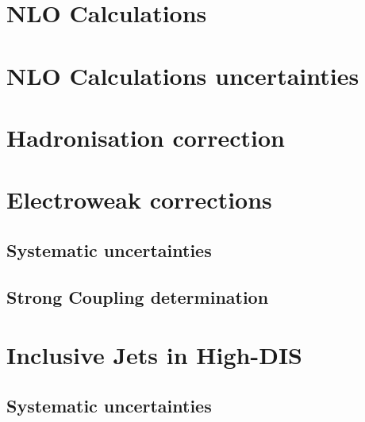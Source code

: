 \section{NLO Calculations}

\section{NLO Calculations uncertainties}

\section{Hadronisation correction}

% 
\section{Electroweak corrections}

 
\subsection{Systematic uncertainties}

\subsection{Strong Coupling determination}

\section{Inclusive Jets in High-\qsq DIS}
\label{sec:incljetsncdis}


\subsection{Systematic uncertainties}
\label{subsec:systunc}

